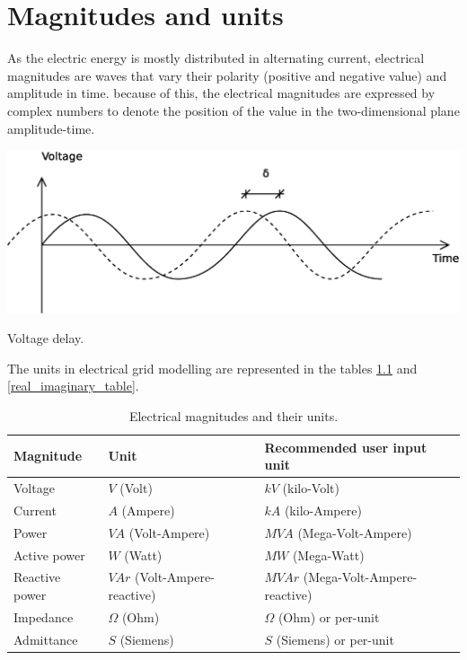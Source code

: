 \documentclass[nols,a4paper,twoside,notoc,fleqn]{tufte-book}
\begin{document}
\chapter{Magnitudes and units}

As the electric energy is mostly distributed in alternating current, electrical magnitudes are waves that vary their polarity (positive and negative value) and amplitude in time. because of this, the electrical magnitudes are expressed by complex numbers to denote the position of the value in the two-dimensional plane amplitude-time. 

\begin{marginfigure}
  \includegraphics[width=\linewidth]{img/VoltageDelay.eps}
  \caption{Voltage delay.}
  \label{fig:vdelay}
\end{marginfigure}


The units in electrical grid modelling are represented in the tables \ref{units_table} and \ref{real_imaginary_table}.


\begin{table}[h]
\begin{center}
\footnotesize
\begin{tabular}{lll}
\toprule
Magnitude & Unit & Recommended user input unit\\
\midrule
Voltage & $V$ (Volt) & $kV$ (kilo-Volt)\\
Current & $A$ (Ampere) & $kA$ (kilo-Ampere)\\
Power & $VA$ (Volt-Ampere) & $MVA$ (Mega-Volt-Ampere)\\
Active power & $W$ (Watt) & $MW$ (Mega-Watt)\\
Reactive power & $VAr$ (Volt-Ampere-reactive) & $MVAr$ (Mega-Volt-Ampere-reactive)\\
Impedance & $\Omega$ (Ohm) & $\Omega$ (Ohm) or per-unit\\
Admittance & $S$ (Siemens) &  $S$ (Siemens) or per-unit\\
\bottomrule
\end{tabular}
\end{center}
  \caption{Electrical magnitudes and their units.}
  \label{units_table}
\end{table}
\end{document}

